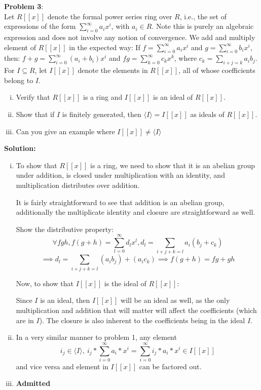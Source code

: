 \documentclass[11pt]{article}
\newcommand{\prob}[3]{\begin{flushleft}
        \textbf{Problem #1}: \\
        #2 
		\textbf{Solution:} 
		#3

\end{flushleft}}
\begin{document}
\prob{3}{
  Let $R[[x]]$ denote the formal power series ring over $R$, i.e., the set of expressions of the form $\sum_{i = 0}^{\infty}a_ix^i$, with $a_i \in R$.
  Note this is purely an algebraic expression and does not involve any notion of convergence.
  We add and multiply element of $R[[x]]$ in the expected way:
  If $f = \sum_{i=0}^{\infty}a_ix^i$ and $g = \sum_{i=0}^{\infty}b_ix^i$, then:
  $f + g = \sum_{i=0}^{\infty}(a_i + b_i)x^i$ and $fg = \sum_{k=0}^{\infty}c_kx^k$, where $c_k = \sum_{i + j = k}a_ib_j$. For $I \subseteq R$, let $I[[x]]$ denote the elements in $R[[x]]$, all of whose coefficients belong to $I$.
  \begin{enumerate}[(i)]
    \item Verify that $R[[x]]$ is a ring and $I[[x]]$ is an ideal of $R[[x]]$.
    \item Show that if $I$ is finitely generated, then $\langle I \rangle = I[[x]]$ as ideals of $R[[x]]$.
    \item Can you give an example where $I[[x]] \neq \langle I \rangle$
  \end{enumerate}
}{
  \begin{enumerate}[(i)]
    \item To show that $R[[x]]$ is a ring, we need to show that it is an abelian group under addition, is closed under multiplication with an identity, and multiplication distributes over addition.

          It is fairly straightforward to see that addition is an abelian group, additionally the multiplicate identity and closure are straightforward as well.

          Show the distributive property:
          $$\forall f g h, f(g + h) = \sum_{l = 0}^{\infty}d_lx^l, d_l = \sum_{i + j + k = l}a_i(b_j + c_k)$$
          $$\implies d_l = \sum_{i + j + k = l}(a_ib_j) + (a_ic_k) \implies f(g + h) = fg + gh$$

          Now, to show that $I[[x]]$ is the ideal of $R[[x]]$:

          Since $I$ is an ideal, then $I[[x]]$ will be an ideal as well,
          as the only multiplication and addition that will matter will
          affect the coefficients (which are in $I$). The closure is also
          inherent to the coefficients being in the ideal $I$.

    \item In a very similar manner to problem 1, any element
          $$i_j \in \langle I \rangle,\ i_j*\sum_{i=0}^{\infty} a_i * x^i = \sum_{i=0}^{\infty} i_j * a_i * x^i \in I[[x]]$$
          and vice versa and element in $I[[x]]$ can be factored out.

    \item \textbf{Admitted}
  \end{enumerate}
}
\end{document}
